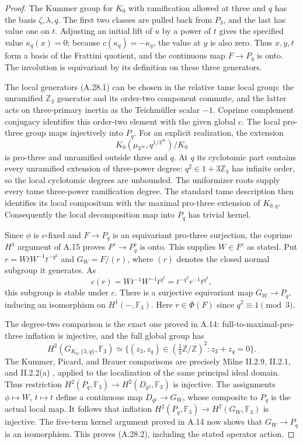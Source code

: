 \begin{proof}
The Kummer group for $K_0$ with ramification
allowed at three and $q$ has the basis
$\zeta,\lambda,q$. The first two classes
are pulled back from $P_3$, and the last
has value one on $t$. Adjusting an initial
lift of $u$ by a power of $t$ gives the
specified value $\kappa_q(x)=0$; because
$c(\kappa_q)=-\kappa_q$, the value at
$y$ is also zero. Thus $x,y,t$ form a
basis of the Frattini quotient, and the
continuous map $F\to P_q$ is onto.
The involution is equivariant by its
definition on these three generators.

The local generators (A.28.1) can be
chosen in the relative tame local group:
the unramified $\mathbb Z_3$ generator
and its order-two component commute,
and the latter acts on three-primary
inertia as the Teichm\"uller scalar $-1$.
Coprime complement conjugacy identifies
this order-two element with the given
global $c$. The local pro-three group
maps injectively into $P_q$. For an
explicit realization, the extension
\[
 K_0(\mu_{3^\infty},q^{1/3^\infty})/K_0
 \tag{A.28.6}
\]
is pro-three and unramified outside three
and $q$. At $q$ its cyclotomic part
contains every unramified extension of
three-power degree: $q^2\in1+3\mathbb Z_3$
has infinite order, so the local
cyclotomic degrees are unbounded. The
uniformizer roots supply every tame
three-power ramification degree. The
standard tame description then identifies
its local compositum with the maximal
pro-three extension of $K_{0,q}$.
Consequently the local decomposition
map into $P_q$ has trivial kernel.

Since $\phi$ is $c$-fixed and $F\to P_q$
is an equivariant pro-three surjection,
the coprime $H^1$ argument of A.15 proves
$F^c\to P_q^c$ is onto. This supplies
$W\in F^c$ as stated. Put
$r=WtW^{-1}t^{-q^2}$ and $G_W=F/(r)$,
where $(r)$ denotes the closed normal
subgroup it generates. As
\[
 c(r)=Wt^{-1}W^{-1}t^{q^2}
        =t^{-q^2}r^{-1}t^{q^2},
\]
this subgroup is stable under $c$.
There is a surjective equivariant map
$G_W\to P_q$, inducing an isomorphism
on $H^1(-,\mathbb F_3)$. Here
$r\in\Phi(F)$ since $q^2\equiv1\pmod3$.

The degree-two comparison is the exact
one proved in A.14: full-to-maximal-pro-three
inflation is injective, and the full
global group has
\[
 H^2(G_{K_0,\{3,q\}},\mathbb F_3)
 \simeq
 \{(z_3,z_q)\in(\tfrac13\mathbb Z/\mathbb Z)^2:
                         z_3+z_q=0\}.
 \tag{A.28.7}
\]
The Kummer, Picard, and Brauer comparisons
are precisely Milne II.2.9, II.2.1, and
II.2.2(a) \cite{MilneADT}, applied to the
localization of the same principal ideal
domain. Thus restriction
$H^2(P_q,\mathbb F_3)\to
H^2(D_{q^2},\mathbb F_3)$ is injective.
The assignments $\phi\mapsto W$,
$t\mapsto t$ define a continuous map
$D_{q^2}\to G_W$, whose composite to
$P_q$ is the actual local map. It follows
that inflation
$H^2(P_q,\mathbb F_3)\to
H^2(G_W,\mathbb F_3)$ is injective.
The five-term kernel argument proved
in A.14 now shows that $G_W\to P_q$
is an isomorphism. This proves (A.28.2),
including the stated operator action.


\end{proof}
